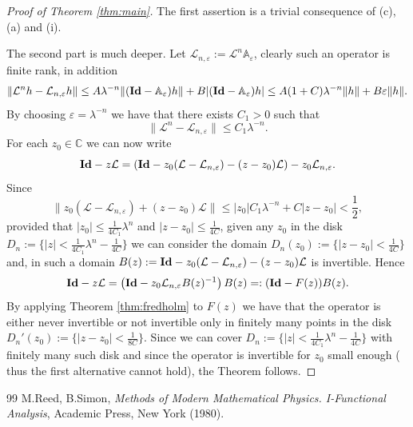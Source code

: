 \documentclass{amsart}
\numberwithin{equation}{section}
\newcommand\Lp{{\mathcal L}}
\newcommand\A{{\mathbb A}}
\newcommand\C{{\mathbb C}}
\newcommand\ve{\varepsilon}
\newcommand\Id{\text{\bf Id}}
\begin{document}
\begin{proof}[Proof of Theorem \ref{thm:main}]
The first assertion is a trivial consequence of (c), (a) and (i). 

The second part is much deeper.
Let $\Lp_{n,\ve}:=\Lp^n\A_\ve$, clearly
such an operator is finite rank, in addition
\[
\|\Lp^n h-\Lp_{n,\ve}h\|\leq
A\lambda^{-n}\|(\Id-\A_\ve)h\|+B|(\Id-\A_\ve)h|
\leq A(1+C)\lambda^{-n}\|h\|+B\ve\|h\|.
\]
By choosing $\ve=\lambda^{-n}$ we have that there exists $C_1>0$ such
that
\[
\|\Lp^n -\Lp_{n,\ve}\|\leq C_1\lambda^{-n}.
\]
For each $z_0\in\C$ we can now write
\[
\Id-z\Lp=(\Id-z_0(\Lp-\Lp_{n,\ve})-(z-z_0)\Lp)-z_0\Lp_{n,\ve}.
\]
Since
\[
\|z_0(\Lp-\Lp_{n,\ve})+(z-z_0)\Lp\|\leq
|z_0|C_1\lambda^{-n}+C|z-z_0|<\frac 12,
\]
provided that $|z_0|\leq \frac 1{4C_1}\lambda^{n}$ and $|z-z_0|\leq
\frac 1{4C}$, given any $z_0$ in the disk $D_n:=\{|z|<\frac
1{4C_1}\lambda^{n}-\frac 1{4C}\}$ we can consider the domain
$D_n(z_0):=\{|z-z_0|<\frac 1{4C}\}$ and, in such a domain
$B(z):=\Id-z_0(\Lp-\Lp_{n,\ve})-(z-z_0)\Lp$ is invertible. Hence
\[
\Id-z\Lp=
\left(\Id-
z_0\Lp_{n,\ve}B(z)^{-1}\right)B(z)=:
(\Id-F(z))B(z).
\]
By applying Theorem \ref{thm:fredholm} to $F(z)$ we have that the
operator is either never invertible or not invertible only in finitely
many points in the disk $D_n'(z_0):=\{|z-z_0|<\frac 1{8C}\}$. Since we
can cover $D_n:=\{|z|<\frac
1{4C_1}\lambda^{n}-\frac 1{4C}\}$ with finitely many such disk and
since the operator is invertible for $z_0$ small enough ( thus the
first alternative cannot hold), the Theorem follows.
\end{proof}


\begin{thebibliography}{99}
\footnotesize
{} M.Reed, B.Simon, {\em Methods of Modern Mathematical
Physics. I-Functional Analysis}, Academic Press, New York (1980). 
\end{thebibliography}
\end{document}

